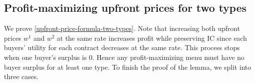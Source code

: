 



\subsection{Profit-maximizing upfront prices for two types} \label{upfront-price-formula-two-types-proof}

We prove \cref{upfront-price-formula-two-types}. Note that increasing both upfront prices $w^1$ and $w^2$ at the same rate increases profit while preserving IC since each buyers' utility for each contract decreases at the same rate. This process stops when one buyer's surplus is 0. Hence any profit-maximizing menu must have no buyer surplus for at least one type. To finish the proof of the lemma, we split into three cases.

